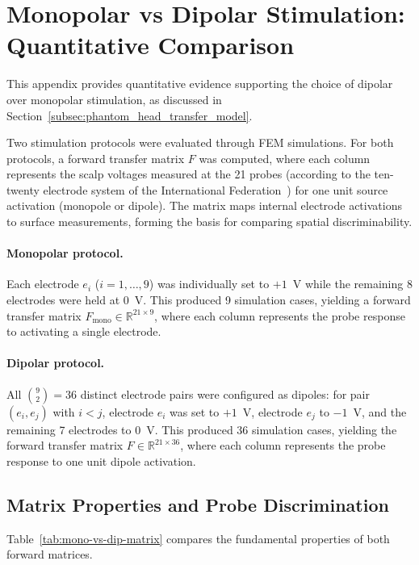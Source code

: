 \section{Monopolar vs Dipolar Stimulation: Quantitative Comparison}
\label{appendix:mono-vs-dipolar}

This appendix provides quantitative evidence supporting the choice of dipolar over monopolar
stimulation, as discussed in Section~\ref{subsec:phantom_head_transfer_model}.

Two stimulation protocols were evaluated through FEM simulations. For both protocols,
a forward transfer matrix $F$ was computed, where each column represents the scalp
voltages measured at the 21 probes (according to the ten-twenty electrode system of the International 
 Federation~\cite{klem-1999}) for one unit source activation (monopole or dipole).
The matrix maps internal electrode activations to surface measurements, forming the
basis for comparing spatial discriminability.

\paragraph*{Monopolar protocol.}
Each electrode $e_i$ ($i = 1, \ldots, 9$) was individually set to $+1$~V while the remaining
8 electrodes were held at $0$~V. This produced 9 simulation cases, yielding a forward
transfer matrix $F_{\text{mono}} \in \mathbb{R}^{21 \times 9}$, where each column
represents the probe response to activating a single electrode.

\paragraph*{Dipolar protocol.}
All $\binom{9}{2} = 36$ distinct electrode pairs were configured as dipoles:
for pair $(e_i, e_j)$ with $i < j$, electrode $e_i$ was set to $+1$~V,
electrode $e_j$ to $-1$~V, and the remaining 7 electrodes to $0$~V.
This produced 36 simulation cases, yielding the forward transfer matrix
$F \in \mathbb{R}^{21 \times 36}$, where each column represents the probe response
to one unit dipole activation.

\subsection{Matrix Properties and Probe Discrimination}

Table~\ref{tab:mono-vs-dip-matrix} compares the fundamental properties of both forward matrices.

